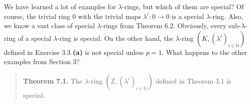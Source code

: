 \documentclass[numbers=enddot,12pt,final,onecolumn,notitlepage]{scrartcl}%
\begin{document}
We have learned a lot of examples for $\lambda$-rings, but which of them are
special? Of course, the trivial ring $0$ with the trivial maps $\lambda
^{i}:0\rightarrow0$ is a special $\lambda$-ring. Also, we know a vast class of
special $\lambda$-rings from Theorem 6.2. Obviously, every sub-$\lambda$-ring
of a special $\lambda$-ring is special. On the other hand, the $\lambda$-ring
$\left(  K,\left(  \lambda^{i}\right)  _{i\in\mathbb{N}}\right)  $ defined in
Exercise 3.3 \textbf{(a)} is not special unless $p=1$. What happens to the
other examples from Section 3?

\begin{quote}
\textbf{Theorem 7.1.} The $\lambda$-ring $\left(  \mathbb{Z},\left(
\lambda^{i}\right)  _{i\in\mathbb{N}}\right)  $ defined in Theorem 3.1 is special.
\end{quote}
\end{document}
